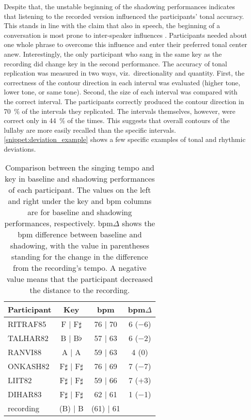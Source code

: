 Despite that, the unstable beginning of the shadowing performances indicates that listening to the recorded version influenced the participants' tonal accuracy.
This stands in line with the claim that also in speech, the beginning of a conversation is most prone to inter-speaker influences \citep[e.g.][]{Orlob2018nine}.
Participants needed about one whole phrase to overcome this influence and enter their preferred tonal center anew.
Interestingly, the only participant who sang in the same key as the recording did change key in the second performance.
The accuracy of tonal replication was measured in two ways, viz.\ directionality and quantity.
First, the correctness of the contour direction in each interval was evaluated (higher tone, lower tone, or same tone).
Second, the size of each interval was compared with the correct interval.
The participants correctly produced the contour direction in \SI{70}{\percent} of the intervals they replicated.
The intervals themselves, however, were correct only in \SI{44}{\percent} of the times.
This suggests that overall contours of the lullaby are more easily recalled than the specific intervals.
\cref{snippet:deviation_example} shows a few specific examples of tonal and rhythmic deviations.
%
\begin{table}
	\caption[Key and \acs{bpm} deviation summary]
			{Comparison between the singing tempo and key in baseline and shadowing performances of each participant.
			The values on the left and right under the key and \acs{bpm} columns are for baseline and shadowing performances, respectively.
			\acs{bpm}$\Delta$ shows the \acs{bpm} difference between baseline and shadowing, with the value in parentheses standing for the change in the difference from the recording's tempo.
			A negative value means that the participant decreased the distance to the recording.}
	\label{tab:bpm_and_keys}
	\centering
	\begin{tabularx}{\linewidth}{Xccc}
		\toprule
		\bfseries{Participant}	& \bfseries{Key}			& \bfseries{\acs{bpm}}		& \bfseries{\acs{bpm}$\Delta$}	\\
		\midrule
		RITRAF85				& F  |  F$\sharp$			& 76  |  70					&  6 ($-$6)						\\
		TALHAR82				& B  |  B$\flat$			& 57  |  63					&  6 ($-$2)						\\
		RANVI88					& A  |  A					& 59  |  63					&  4 (\phantom{$-$}0)			\\
		ONKASH82				& F$\sharp$  |  F$\sharp$	& 76  |  69					&  7 ($-$7)						\\
		LIIT82					& F$\sharp$  |  F$\sharp$	& 59  |  66					&  7 ($+$3)						\\
		DIHAR83					& F$\sharp$  |  F$\sharp$	& 62  |  61					&  1 ($-$1)						\\
		\rule{0pt}{0.5cm}%
		recording				& (B) | B					& (61) | 61					&								\\
		\bottomrule
	\end{tabularx}
\end{table}
